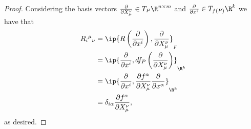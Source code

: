\begin{proof}
	Considering the basis vectors $\frac{\partial}{\partial X^\nu_\mu}\in T_P\R^{n\times m}$ and $\frac{\partial}{\partial x^i}\in T_{f(P)}\R^k$ we have that
	\begin{align*}
		R_i{^\mu}{_\nu}&=\ip{R\left(\frac{\partial}{\partial x^i}\right), \frac{\partial}{\partial X^\nu_\mu}}_F\\
		&=\ip{\frac{\partial}{\partial x^i},df_P\left(\frac{\partial}{\partial X^\nu_\mu}\right)}_{\R^k}\\
		&=\ip{\frac{\partial}{\partial x^i},\frac{\partial f^\alpha}{\partial X^\nu_\mu}\frac{\partial}{\partial x^\alpha}}_{\R^k}\\
		&=\delta_{i\alpha}\frac{\partial f^\alpha}{\partial X^\nu_\mu},
	\end{align*}
	as desired.
\end{proof}





